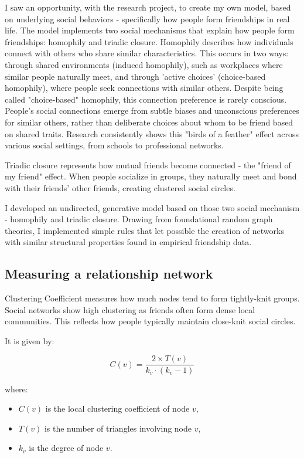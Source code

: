 \documentclass[runningheads]{llncs}
\begin{document}
I saw an opportunity, with the research project, to create my own model, based on underlying social behaviors - specifically how people form friendships in real life. The model implements two social mechanisms that explain how people form friendships: homophily and triadic closure.
Homophily describes how individuals connect with others who share similar characteristics. This occurs in two ways: through shared environments (induced homophily), such as workplaces where similar people naturally meet, and through 'active choices' (choice-based homophily), where people seek connections with similar others.
Despite being called "choice-based" homophily, this connection preference is rarely conscious. People's social connections emerge from subtle biases and unconscious preferences for similar others, rather than deliberate choices about whom to be friend based on shared traits.
Research consistently shows this "birds of a feather" effect across various social settings, from schools to professional networks.

Triadic closure represents how mutual friends become connected - the "friend of my friend" effect. When people socialize in groups, they naturally meet and bond with their friends' other friends, creating clustered social circles.

\clearpage

I developed an undirected, generative model based on those two social mechanism - homophily and triadic closure. Drawing from foundational random graph theories, I implemented simple rules that let possible the creation of networks with similar structural properties found in empirical friendship data.

\subsection{Measuring a relationship network}
Clustering Coefficient measures how much nodes tend to form tightly-knit groups. Social networks show high clustering as friends often form dense local communities. This reflects how people typically maintain close-knit social circles.

It is given by:

\begin{equation}
C(v) = \frac{2 \times T(v)}{k_v \cdot (k_v - 1)}
\label{eq:local_clustering}
\end{equation}

where:
\begin{itemize}
    \item $C(v)$ is the local clustering coefficient of node $v$,
    \item $T(v)$ is the number of triangles involving node $v$,
    \item $k_v$ is the degree of node $v$.
\end{itemize}
\end{document}
